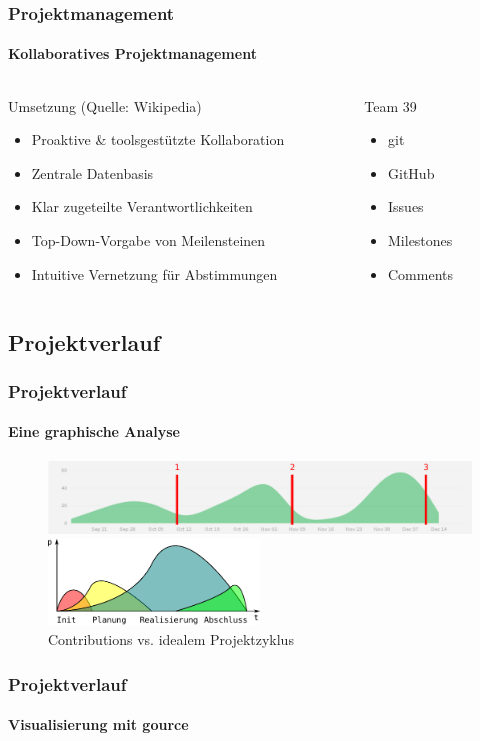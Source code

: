 \begin{frame}
	\frametitle{Projektmanagement \hfill \footnotesize \group}
	\framesubtitle{Kollaboratives Projektmanagement}
	\begin{columns}
		\begin{column}{0.7\textwidth}
			\begin{block}{Umsetzung (Quelle: Wikipedia)}
				\begin{itemize}
					\item Proaktive \& toolsgestützte Kollaboration
					\item Zentrale Datenbasis
					\item Klar zugeteilte Verantwortlichkeiten
					\item Top-Down-Vorgabe von Meilensteinen
					\item Intuitive Vernetzung für Abstimmungen
				\end{itemize}
			\end{block}
		\end{column}
		\pause
		\begin{column}{0.3\textwidth}
			\begin{exampleblock}{Team 39}
				\begin{itemize}
					\item git
					\item GitHub
					\item Issues
					\item Milestones
					\item Comments
				\end{itemize}
			\end{exampleblock}
		\end{column}
	\end{columns}
\end{frame}

\subsection{Projektverlauf}
\begin{frame}
	\frametitle{Projektverlauf\hfill{}\footnotesize \group}
	\framesubtitle{Eine graphische Analyse}
	\begin{figure}
		\centering
		\includegraphics[width=1\textwidth]{../../fig/pm/gh-contributions-ov_marked.pdf}

		\includegraphics[width=0.5\textwidth]{../../fig/pm/pm-phasen.pdf}
		\caption{Contributions vs. idealem Projektzyklus}
	\end{figure}
\end{frame}

\begin{frame}
	\frametitle{Projektverlauf\hfill{}\footnotesize \group}
	\framesubtitle{Visualisierung mit gource}
\end{frame}
